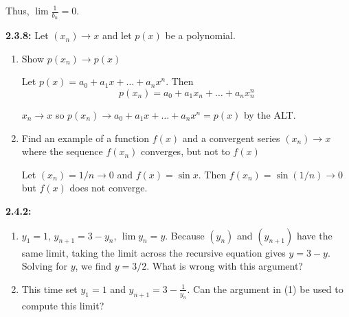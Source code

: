 \documentclass[12pt]{article}
\begin{document}
        \color{red}
        Thus, $\lim \frac{1}{b_n} = 0$. 
    \color{black}


\textbf{2.3.8:} Let $(x_n) \to x$ and let $p(x)$ be a polynomial. 
\begin{enumerate}
    \item Show $p(x_n) \to p(x)$
    
        \color{blue}
            Let $p(x) = a_0 + a_1x + \dots + a_nx^n$. Then 
            \[p(x_n) = a_0 + a_1x_n + \dots + a_nx_n^n\]
          
            $x_n \to x$ so $p(x_n) \to a_0 + a_1x + \dots + a_n x^n = p(x)$ by the ALT. 
        \color{black}

    \item Find an example of a function $f(x)$ and a convergent series $(x_n) \to x$ where the sequence $f(x_n)$ converges, but not to $f(x)$ 

        \color{blue}
            Let $(x_n) = 1/n \to 0$ and $f(x) = \sin x$. Then $f(x_n) = \sin(1/n) \to 0$ but $f(x)$ does not converge. 
        \color{black}

\end{enumerate}

\textbf{2.4.2:}
\begin{enumerate}
    \item $y_1 = 1$, $y_{n+1} = 3 - y_n$, $\lim y_n = y$. Because $(y_n)$ and $(y_{n+1})$ have the same limit, taking the limit across the recursive equation gives $y = 3 - y$. Solving for $y$, we find $y = 3/2$. What is wrong with this argument? 
    \item This time set $y_1 = 1$ and $y_{n+1} = 3 - \frac{1}{y_n}$. Can the argument in (1) be used to compute this limit?
\end{enumerate}
\end{document}
